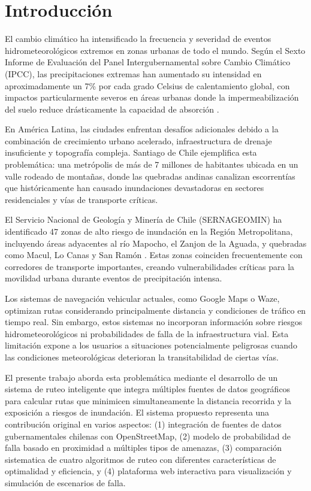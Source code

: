 \documentclass[conference]{IEEEtran}
\begin{document}
\section{Introducción}

El cambio climático ha intensificado la frecuencia y severidad de eventos hidrometeorológicos extremos en zonas urbanas de todo el mundo. Según el Sexto Informe de Evaluación del Panel Intergubernamental sobre Cambio Climático (IPCC), las precipitaciones extremas han aumentado su intensidad en aproximadamente un 7\% por cada grado Celsius de calentamiento global, con impactos particularmente severos en áreas urbanas donde la impermeabilización del suelo reduce drásticamente la capacidad de absorción \citep{ipcc2021}.

En América Latina, las ciudades enfrentan desafíos adicionales debido a la combinación de crecimiento urbano acelerado, infraestructura de drenaje insuficiente y topografía compleja. Santiago de Chile ejemplifica esta problemática: una metrópolis de más de 7 millones de habitantes ubicada en un valle rodeado de montañas, donde las quebradas andinas canalizan escorrentías que históricamente han causado inundaciones devastadoras en sectores residenciales y vías de transporte críticas.

El Servicio Nacional de Geología y Minería de Chile (SERNAGEOMIN) ha identificado 47 zonas de alto riesgo de inundación en la Región Metropolitana, incluyendo áreas adyacentes al río Mapocho, el Zanjon de la Aguada, y quebradas como Macul, Lo Canas y San Ramón \citep{sernageomin2020}. Estas zonas coinciden frecuentemente con corredores de transporte importantes, creando vulnerabilidades críticas para la movilidad urbana durante eventos de precipitación intensa.

Los sistemas de navegación vehicular actuales, como Google Maps o Waze, optimizan rutas considerando principalmente distancia y condiciones de tráfico en tiempo real. Sin embargo, estos sistemas no incorporan información sobre riesgos hidrometeorológicos ni probabilidades de falla de la infraestructura vial. Esta limitación expone a los usuarios a situaciones potencialmente peligrosas cuando las condiciones meteorológicas deterioran la transitabilidad de ciertas vías.

El presente trabajo aborda esta problemática mediante el desarrollo de un sistema de ruteo inteligente que integra múltiples fuentes de datos geográficos para calcular rutas que minimicen simultaneamente la distancia recorrida y la exposición a riesgos de inundación. El sistema propuesto representa una contribución original en varios aspectos: (1) integración de fuentes de datos gubernamentales chilenas con OpenStreetMap, (2) modelo de probabilidad de falla basado en proximidad a múltiples tipos de amenazas, (3) comparación sistematica de cuatro algoritmos de ruteo con diferentes características de optimalidad y eficiencia, y (4) plataforma web interactiva para visualización y simulación de escenarios de falla.
\end{document}
